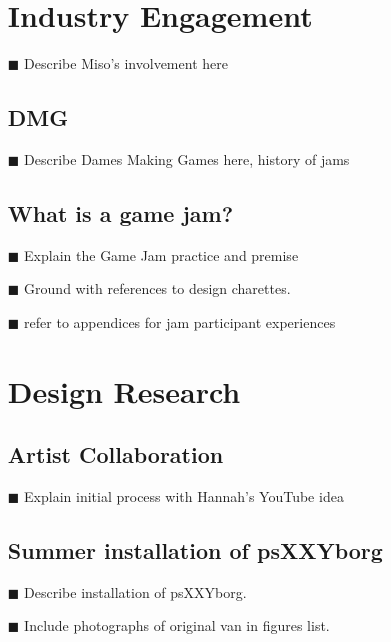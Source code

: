 \begin{itemize}
\section{Industry Engagement}

\item[\tiny{$\blacksquare$}] Describe Miso's involvement here

\subsection{DMG}

\item[\tiny{$\blacksquare$}] Describe Dames Making Games here, history of jams


\subsection{What is a game jam?}

\item[\tiny{$\blacksquare$}] Explain the Game Jam practice and premise
\item[\tiny{$\blacksquare$}] Ground with references to design charettes.
\item[\tiny{$\blacksquare$}] refer to appendices for jam participant experiences

\section{Design Research}

\subsection{Artist Collaboration}
\item[\tiny{$\blacksquare$}] Explain initial process with Hannah's YouTube idea

\subsection{Summer installation of psXXYborg}
\item[\tiny{$\blacksquare$}] Describe installation of psXXYborg.
\item[\tiny{$\blacksquare$}] Include photographs of original van in figures list.


\end{itemize}
